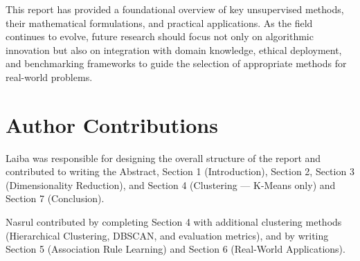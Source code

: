 \documentclass[conference]{IEEEtran}
\begin{document}
This report has provided a foundational overview of key unsupervised methods, their mathematical formulations, and practical applications. As the field continues to evolve, future research should focus not only on algorithmic innovation but also on integration with domain knowledge, ethical deployment, and benchmarking frameworks to guide the selection of appropriate methods for real-world problems.



\section*{Author Contributions}
Laiba was responsible for designing the overall structure of the report and contributed to writing the Abstract, Section 1 (Introduction), Section 2, Section 3 (Dimensionality Reduction), and Section 4 (Clustering — K-Means only) and Section 7 (Conclusion). 

Nasrul contributed by completing Section 4 with additional clustering methods (Hierarchical Clustering, DBSCAN, and evaluation metrics), and by writing Section 5 (Association Rule Learning) and Section 6 (Real-World Applications).















%
%
%


\end{document}
